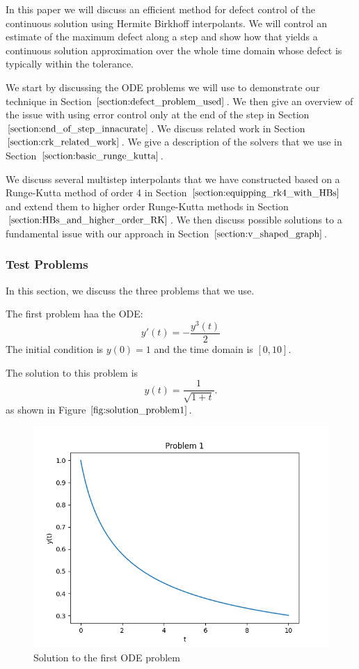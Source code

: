 \documentclass{article}
\begin{document}
In this paper we will discuss an efficient method for defect control of the continuous solution using Hermite Birkhoff interpolants. We will control an estimate of the maximum defect along a step and show how that yields a continuous solution approximation over the whole time domain whose defect is typically within the tolerance.

We start by discussing the ODE problems we will use to demonstrate our technique in Section $\ref{section:defect_problem_used}$. We then give an overview of the issue with using error control only at the end of the step in Section $\ref{section:end_of_step_innacurate}$. We discuss related work in Section $\ref{section:crk_related_work}$. We give a description of the solvers that we use in Section $\ref{section:basic_runge_kutta}$. 

We discuss several multistep interpolants that we have constructed based on a Runge-Kutta method of order 4 in Section $\ref{section:equipping_rk4_with_HBs}$ and extend them to higher order Runge-Kutta methods in Section $\ref{section:HBs_and_higher_order_RK}$. We then discuss possible solutions to a fundamental issue with our approach in Section $\ref{section:v_shaped_graph}$.

\subsubsection{Test Problems}
\label{section:defect_problem_used}
In this section, we discuss the three problems that we use. 

The first problem haa the ODE:
\begin{equation}
y'(t) = - \frac{y^{3}(t)}{2} 
\end{equation}
The initial condition is $y(0) = 1$ and the time domain is $[0, 10]$.

The solution to this problem is
\begin{equation}
y(t) = \frac{1}{\sqrt{1 + t}}.
\end{equation}
as shown in Figure $\ref{fig:solution_problem1}$.

\begin{figure}[H]
\centering
\includegraphics[width=0.7\linewidth]{./figures/solution_problem1}
\caption{Solution to the first ODE problem}
\label{fig:solution_problem1}
\end{figure}
\end{document}
